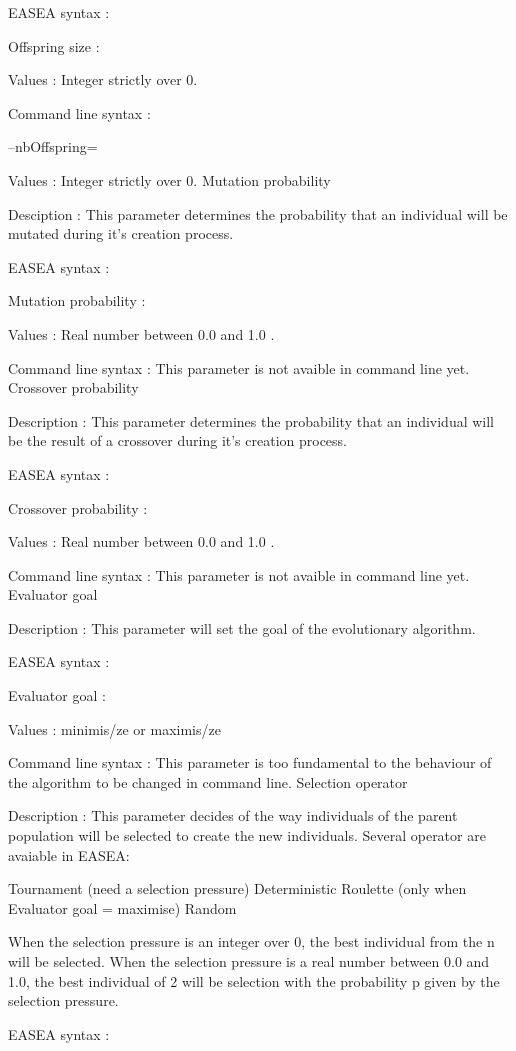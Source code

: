 \documentclass{article}
\begin{document}
EASEA syntax :

Offspring size :

Values : Integer strictly over 0.

Command line syntax :

--nbOffspring=

Values : Integer strictly over 0.
Mutation probability

Desciption :
This parameter determines the probability that an individual will be mutated during it's creation process.

EASEA syntax :

Mutation probability :

Values : Real number between 0.0 and 1.0 .

Command line syntax :
This parameter is not avaible in command line yet.
Crossover probability

Description :
This parameter determines the probability that an individual will be the result of a crossover during it's creation process.

EASEA syntax :

Crossover probability :

Values : Real number between 0.0 and 1.0 .

Command line syntax :
This parameter is not avaible in command line yet.
Evaluator goal

Description :
This parameter will set the goal of the evolutionary algorithm.

EASEA syntax :

Evaluator goal :

Values : minimis/ze or maximis/ze

Command line syntax :
This parameter is too fundamental to the behaviour of the algorithm to be changed in command line.
Selection operator

Description :
This parameter decides of the way individuals of the parent population will be selected to create the new individuals. Several operator are avaiable in EASEA:

    Tournament (need a selection pressure)
    Deterministic
    Roulette (only when Evaluator goal = maximise)
    Random 

When the selection pressure is an integer over 0, the best individual from the n will be selected.
When the selection pressure is a real number between 0.0 and 1.0, the best individual of 2 will be selection with the probability p given by the selection pressure.

EASEA syntax :
\end{document}
